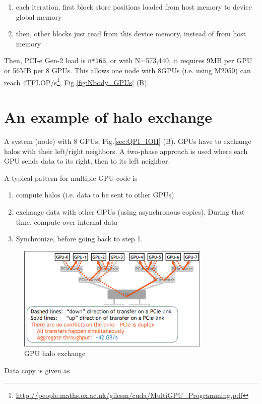 \begin{enumerate}
  \item each iteration, first block store positions loaded from host memory to
  device global memory
  \item then, other blocks just read from this device memory, instead of from
  host memory
\end{enumerate}
Then, PCI-e Gen-2 load is \verb!n*16B!, or with N=573,440, it requires 9MB per
GPU or 56MB per 8 GPUs. This allows one node with 8GPUs (i.e. using M2050) can
reach
4TFLOP/s\footnote{\url{http://people.maths.ox.ac.uk/gilesm/cuda/MultiGPU_Programming.pdf}},
Fig.\ref{fig:Nbody_GPUs} (B).

\section{An example of halo exchange}
\label{sec:GPUs_example}


A system (node) with 8 GPUs, Fig.\ref{sec:QPI_IOH} (B). GPUs have to exchange
halos with their left/right neighbors. A two-phase approach is used where each
GPU sends data to its right, then to its left neighbor. 

A typical pattern for multiple-GPU code is 
\begin{enumerate}
  \item compute halos (i.e. data to be sent to other GPUs)
  \item exchange data with other GPUs (using asynchronous copies). During that
  time, compute over internal data 
  \item Synchronize, before going back to step 1.
\end{enumerate}

\begin{figure}[hbt]
  \centerline{\includegraphics[height=5cm,
    angle=0]{./images/GPUs_right_step2.eps} }
\caption{GPU halo exchange}
\label{fig:GPUs_rightphase}
\end{figure}

Data copy is given as

